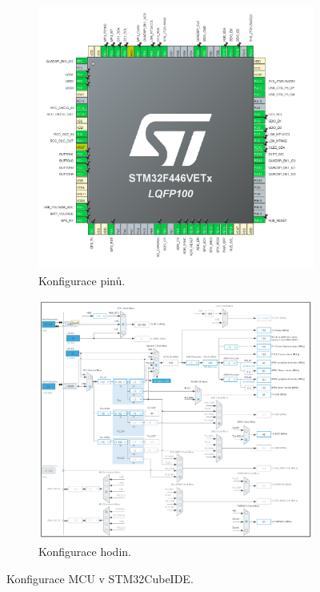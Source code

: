 \begin{figure}[h]
     \centering
     \begin{subfigure}[b]{0.4\textwidth}
         \centering
         \includegraphics[width=\textwidth]{obrazky/cubePinout}
         \caption{Konfigurace pinů.}
       
     \end{subfigure}
     \hfill
     \begin{subfigure}[b]{0.4\textwidth}
         \centering
         \includegraphics[width=\textwidth]{obrazky/cubeClock}
         \caption{Konfigurace hodin.}
         
     \end{subfigure}
        \caption{Konfigurace MCU v STM32CubeIDE.}
        \label{fig:cubeConfig}
\end{figure}

